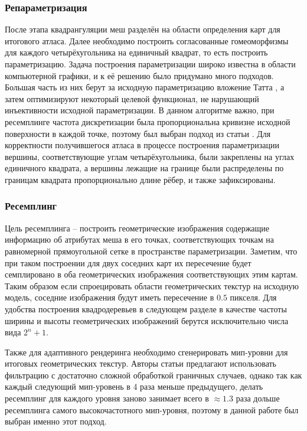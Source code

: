 \documentclass[12pt]{extarticle}
\begin{document}
\subsubsection{Репараметризация}
После этапа квадрангуляции меш разделён на области определения карт для итогового атласа. Далее необходимо построить согласованные гомеоморфизмы для каждого четырёхугольника на единичный квадрат, то есть построить параметризацию. Задача построения параметризации широко известна в области компьютерной графики, и к её решению было придумано много подходов. Большая часть из них берут за исходную параметризацию вложение Татта \cite{tutte1963}, а затем оптимизируют некоторый целевой функционал, не нарушающий инъективности исходной параметризации. В данном алгоритме важно, при ресемплинге частота дискретизации была пропорциональна кривизне исходной поверхности в каждой точке, поэтому был выбран подход из статьи \cite{sander2001}. Для корректности получившегося атласа в процессе построения параметризации вершины, соответствующие углам четырёхугольника, были закреплены на углах единичного квадрата, а вершины лежащие на границе были распределены по границам квадрата пропорционально длине рёбер, и также зафиксированы.

\subsubsection{Ресемплинг}
Цель ресемплинга -- построить геометрические изображения содержащие информацию об атрибутах меша в его точках, соответствующих точкам на равномерной прямоугольной сетке в пространстве параметризации. Заметим, что при таком построении для двух соседних карт их пересечение будет семплировано в оба геометрических изображения соответствующих этим картам. Таким образом если спроецировать области геометрических текстур на исходную модель, соседние изображения будут иметь пересечение в $0.5$ пикселя. Для удобства построения квадродеревьев в следующем разделе в качестве частоты ширины и высоты геометрических изображений берутся исключительно числа вида $2^n + 1$.

Также для адаптивного рендеринга необходимо сгенерировать мип-уровни для итоговых геометрических текстур. Авторы статьи \cite{purnomo2004} предлагают использовать фильтрацию с достаточно сложной обработкой граничных случаев, однако так как каждый следующий мип-уровень в 4 раза меньше предыдущего, делать ресемплинг для каждого уровня заново занимает всего в $\approx1.3$ раза дольше ресемплинга самого высокочастотного мип-уровня, поэтому в данной работе был выбран именно этот подход.
\end{document}
